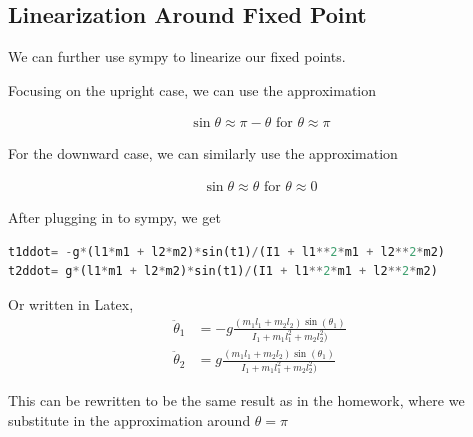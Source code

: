 \documentclass[conference]{IEEEtran}
\begin{document}



\subsection{Linearization Around Fixed Point}

We can further use sympy to linearize our fixed points.

Focusing on the upright case, we can use the approximation

\begin{align}
    \sin\theta \approx \pi - \theta \text{ for } \theta \approx \pi
\end{align}

For the downward case, we can similarly use the approximation

\begin{align}
    \sin\theta \approx \theta \text{ for } \theta \approx 0
\end{align}

After plugging in to sympy, we get 

\begin{lstlisting}[language=Python, frame=single]
t1ddot= -g*(l1*m1 + l2*m2)*sin(t1)/(I1 + l1**2*m1 + l2**2*m2)
t2ddot= g*(l1*m1 + l2*m2)*sin(t1)/(I1 + l1**2*m1 + l2**2*m2)
\end{lstlisting}

Or written in Latex,
\begin{align}
    \ddot \theta_1 &= -g \frac{(m_1 l_1 + m_2 l_2) \sin(\theta_1) } 
    {I_1 + m_1 l_1^2 + m_2 l_2^2)} \\
    \ddot \theta_2 &= g \frac{(m_1 l_1 + m_2 l_2) \sin(\theta_1) } 
    {I_1 + m_1 l_1^2 + m_2 l_2^2)}
\end{align}


This can be rewritten to be the same result as in the homework, where we
substitute in the approximation around $\theta = \pi$
\end{document}
